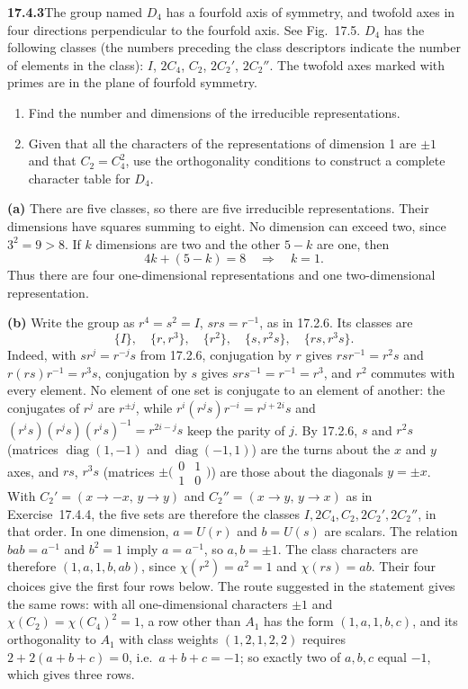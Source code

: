 \par\bigskip
\noindent\textbf{17.4.3}\quad The group named $D_{4}$ has a fourfold
axis of symmetry, and twofold axes in four directions perpendicular
to the fourfold axis. See Fig.~17.5. $D_{4}$ has the following
classes (the numbers preceding the class descriptors indicate the
number of elements in the class): $I$, $2C_{4}$, $C_{2}$, $2C_{2}'$,
$2C_{2}''$. The twofold axes marked with primes are in the plane of
fourfold symmetry.
\begin{enumerate}
\item[(a)] Find the number and dimensions of the irreducible
representations.
\item[(b)] Given that all the characters of the representations of
dimension 1 are $\pm1$ and that $C_{2}=C_{4}^{2}$, use the
orthogonality conditions to construct a complete character table for
$D_{4}$.
\end{enumerate}
\solution
\textbf{(a)} There are five classes, so there are five irreducible
representations. Their dimensions have squares summing to eight.
No dimension can exceed two, since $3^2=9>8$. If $k$ dimensions are two and
the other $5-k$ are one, then
\[
4k+(5-k)=8\quad\Longrightarrow\quad k=1.
\]
Thus there are four one-dimensional representations and one
two-dimensional representation.

\textbf{(b)} Write the group as
$r^4=s^2=I$, $srs=r^{-1}$, as in 17.2.6.
Its classes are
\[
\{I\},\quad\{r,r^3\},\quad\{r^2\},\quad
\{s,r^2s\},\quad\{rs,r^3s\}.
\]
Indeed, with $sr^j=r^{-j}s$ from 17.2.6, conjugation by $r$ gives
$rsr^{-1}=r^2s$ and $r(rs)r^{-1}=r^3s$, conjugation by $s$ gives
$srs^{-1}=r^{-1}=r^3$, and $r^2$ commutes with every element.
No element of one set is conjugate to an element of another: the
conjugates of $r^j$ are $r^{\pm j}$, while $r^i(r^js)r^{-i}=r^{j+2i}s$
and $(r^is)(r^js)(r^is)^{-1}=r^{2i-j}s$ keep the parity of $j$.
By 17.2.6, $s$ and $r^2s$ (matrices $\operatorname{diag}(1,-1)$ and
$\operatorname{diag}(-1,1)$) are the turns about the $x$ and $y$ axes,
and $rs$, $r^3s$ (matrices
$\pm\bigl(\begin{smallmatrix}0&1\\1&0\end{smallmatrix}\bigr)$) are
those about the diagonals $y=\pm x$. With $C_2'=(x\to-x,\,y\to y)$
and $C_2''=(x\to y,\,y\to x)$ as in Exercise~17.4.4, the five sets
are therefore the classes $I,2C_4,C_2,2C_2',2C_2''$, in that order.
In one dimension, $a=U(r)$ and $b=U(s)$ are scalars.
The relation $bab=a^{-1}$ and $b^2=1$ imply $a=a^{-1}$,
so $a,b=\pm1$. The class characters are therefore
$(1,a,1,b,ab)$, since $\chi(r^2)=a^2=1$ and $\chi(rs)=ab$.
Their four choices give the first four rows below.
The route suggested in the statement gives the same rows: with all
one-dimensional characters $\pm1$ and $\chi(C_2)=\chi(C_4)^2=1$, a row
other than $A_1$ has the form $(1,a,1,b,c)$, and its orthogonality to
$A_1$ with class weights $(1,2,1,2,2)$ requires $2+2(a+b+c)=0$, i.e.\
$a+b+c=-1$; so exactly two of $a,b,c$ equal $-1$, which gives three rows.

